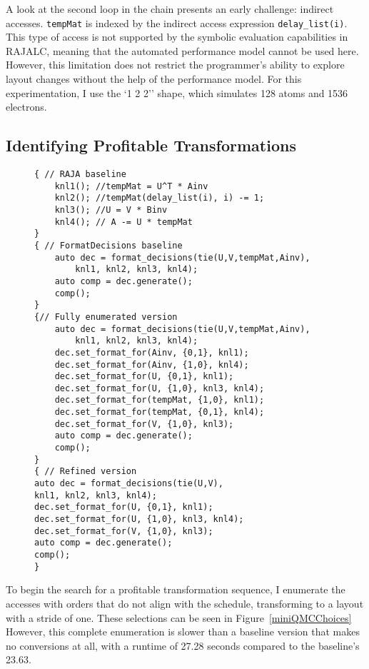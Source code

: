 A look at the second loop in the chain presents an early challenge: indirect accesses. 
\verb.tempMat. is indexed by the indirect access expression \verb.delay_list(i).. 
This type of access is not supported by the symbolic evaluation capabilities in RAJALC, meaning that the automated performance model cannot be used here.
However, this limitation does not restrict the programmer's ability to explore layout changes without the help of the performance model. 
For this experimentation, I use the `1 2 2'' shape, which simulates 128 atoms and 1536 electrons.

\subsection{Identifying Profitable Transformations}
\begin{figure}
\begin{lstlisting}[caption={Different layout transformations selected as part of the miniQMC exploration.}, label={miniQMCChoices}]
{ // RAJA baseline
	knl1(); //tempMat = U^T * Ainv
	knl2(); //tempMat(delay_list(i), i) -= 1;
	knl3(); //U = V * Binv
	knl4(); // A -= U * tempMat
}
{ // FormatDecisions baseline
	auto dec = format_decisions(tie(U,V,tempMat,Ainv), 
		knl1, knl2, knl3, knl4);
	auto comp = dec.generate();
	comp();
}
{// Fully enumerated version
	auto dec = format_decisions(tie(U,V,tempMat,Ainv), 
		knl1, knl2, knl3, knl4);
	dec.set_format_for(Ainv, {0,1}, knl1);
	dec.set_format_for(Ainv, {1,0}, knl4);
	dec.set_format_for(U, {0,1}, knl1);
	dec.set_format_for(U, {1,0}, knl3, knl4);
	dec.set_format_for(tempMat, {1,0}, knl1);
	dec.set_format_for(tempMat, {0,1}, knl4);
	dec.set_format_for(V, {1,0}, knl3);
	auto comp = dec.generate();
	comp();
}
{ // Refined version
auto dec = format_decisions(tie(U,V), 
knl1, knl2, knl3, knl4);
dec.set_format_for(U, {0,1}, knl1);
dec.set_format_for(U, {1,0}, knl3, knl4);
dec.set_format_for(V, {1,0}, knl3);
auto comp = dec.generate();
comp();
}
\end{lstlisting}
\end{figure}

To begin the search for a profitable transformation sequence, I enumerate the accesses with orders that do not align with the schedule, transforming to a layout with a stride of one.
These selections can be seen in Figure~\ref{miniQMCChoices}
However, this complete enumeration is slower than a baseline \FormatDecisions{} version that makes no conversions at all, with a runtime of 27.28 seconds compared to the baseline's 23.63.

